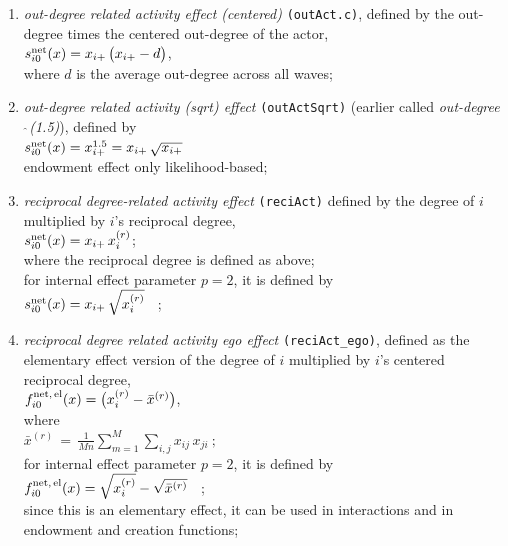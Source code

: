\documentclass[a4paper,fleqn,11pt]{article}
\newcommand{\+}{\, + \,}
\newcommand{\vit}{\theenumi}
\begin{document}
\begin{enumerate}
 \item {\em out-degree related activity effect (centered)} \texttt{(outAct.c)},
 defined by the out-degree times the centered out-degree of the actor,\\
 $s^{\rm net}_{i\vit}(x) =  x_{i+}\,\big( x_{i+} - d \big)$,\\
 where $d$ is the average out-degree across all waves;

 \item {\em out-degree related activity (sqrt) effect}  \texttt{(outActSqrt)}
 (earlier called {\em out-degree$\,\hat{\ }$(1.5)}), defined by  \\
 $s^{\rm net}_{i\vit}(x) = x^{1.5}_{i+} = x_{i+}\,\sqrt{x_{i+}}$ \\
 endowment effect only likelihood-based;

 \item {\em reciprocal degree-related activity effect} \texttt{(reciAct)}
 defined by the degree of $i$ multiplied by $i$'s reciprocal degree,\\
 $s^{\rm net}_{i\vit}(x) =   x_{i+}\, x^{(r)}_{i} $; \\
 where the reciprocal degree is defined as above;\\
 for internal effect parameter $p=2$, it is defined by\\
 $s^{\rm net}_{i\vit}(x) =   x_{i+}\, \sqrt{x^{(r)}_{i}} $ \ ; \\

 \item {\em reciprocal degree related activity ego effect} \texttt{(reciAct\_ego)},
 	 defined as the elementary effect version of the
 degree of $i$ multiplied by $i$'s centered reciprocal degree,\\
 $ f^{\rm net,\, el}_{i\vit}(x)  =  \big( x^{(r)}_{i} - \bar x^{(r)} \big) $, \\
 where \\
 $ \bar x^{(r)}  \,=\, \frac{1}{Mn} \sum_{m=1}^M \sum_{i,j} x_{ij}\,x_{ji} \ ;  $ \\
 for internal effect parameter $p=2$, it is defined by\\
 $f^{\rm net,\, el}_{i\vit}(x)  =   \sqrt{ x^{(r)}_{i}} - \sqrt{\bar x^{(r)}} $ \ ; \\
 since this is an elementary effect, it can be used in interactions
 and in endowment and creation functions;


\end{enumerate}
\end{document}
